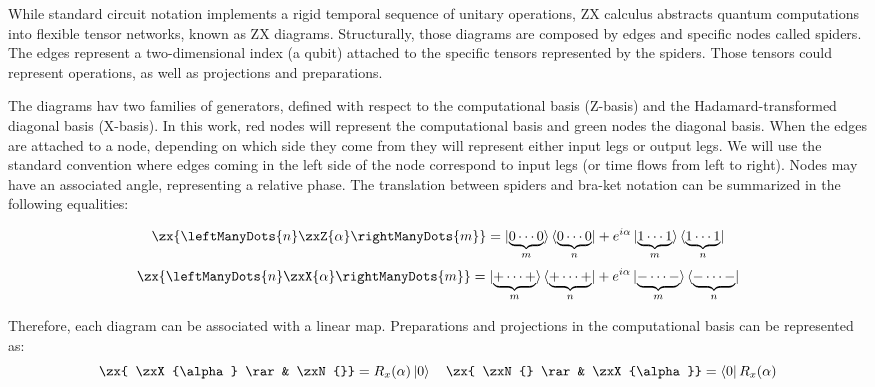 \documentclass[12pt, twoside, openany]{book}
\begin{document}
While standard circuit notation implements a rigid temporal sequence of unitary operations, ZX calculus abstracts quantum computations into flexible tensor networks, known as ZX diagrams. Structurally, those diagrams are composed by edges and specific nodes called spiders. The edges represent a two-dimensional index (a qubit) attached to the specific tensors represented by the spiders. Those tensors could represent operations, as well as projections and preparations.

The diagrams hav two families of generators, defined with respect to the computational basis (Z-basis) and the Hadamard-transformed diagonal basis (X-basis). In this work, red nodes will represent the computational basis and green nodes the diagonal basis. When the edges are attached to a node, depending on which side they come from they will represent either input legs or output legs. We will use the standard convention where edges coming in the left side of the node correspond to input legs (or time flows from left to right). Nodes may have an associated angle, representing a relative phase. The translation between spiders and bra-ket notation can be summarized in the following equalities:

\begin{equation}
\zx{ \leftManyDots{n} \zxZ{\alpha} \rightManyDots{m}} = \ket{\underbrace{0 \cdots 0}_{m}} \bra{\underbrace{0 \cdots 0}_{n}} + e^{i \alpha} \ket{{\underbrace{1 \cdots 1}_{m}}} \bra{\underbrace{1 \cdots 1}_{n}} 
\end{equation}
\begin{equation*}
\zx{\leftManyDots{n} \zxX{\alpha} \rightManyDots{m}} = \ket{\underbrace{+ \cdots +}_{m}} \bra{\underbrace{+ \cdots +}_{n}} + e^{i \alpha} \ket{{\underbrace{- \cdots -}_{m}}} \bra{\underbrace{- \cdots -}_{n}}
\end{equation*}

Therefore, each diagram can be associated with a linear map. Preparations and projections in the computational basis can be represented as:
\begin{equation}
    \zx{ \zxX{\alpha} \rar & \zxN{}} = R_x (\alpha) \ket{0} \quad \zx{ \zxN{} \rar & \zxX{\alpha}} = \bra{0} R_x  (\alpha)
\end{equation}
\end{document}

